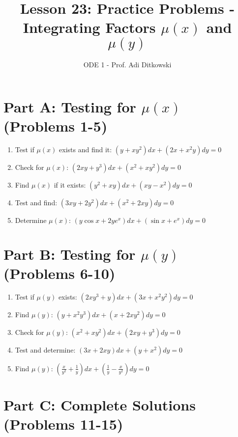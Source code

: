 \documentclass[12pt]{article}
\title{Lesson 23: Practice Problems - Integrating Factors $\mu(x)$ and $\mu(y)$}
\author{ODE 1 - Prof. Adi Ditkowski}
\date{}
\begin{document}
\maketitle

\section*{Part A: Testing for $\mu(x)$ (Problems 1-5)}

\begin{enumerate}
\item Test if $\mu(x)$ exists and find it: $(y + xy^2)dx + (2x + x^2y)dy = 0$

\item Check for $\mu(x)$: $(2xy + y^3)dx + (x^2 + xy^2)dy = 0$

\item Find $\mu(x)$ if it exists: $(y^2 + xy)dx + (xy - x^2)dy = 0$

\item Test and find: $(3xy + 2y^2)dx + (x^2 + 2xy)dy = 0$

\item Determine $\mu(x)$: $(y\cos x + 2ye^x)dx + (\sin x + e^x)dy = 0$
\end{enumerate}

\section*{Part B: Testing for $\mu(y)$ (Problems 6-10)}

\begin{enumerate}[start=6]
\item Test if $\mu(y)$ exists: $(2xy^3 + y)dx + (3x + x^2y^2)dy = 0$

\item Find $\mu(y)$: $(y + x^2y^3)dx + (x + 2xy^2)dy = 0$

\item Check for $\mu(y)$: $(x^2 + xy^2)dx + (2xy + y^3)dy = 0$

\item Test and determine: $(3x + 2xy)dx + (y + x^2)dy = 0$

\item Find $\mu(y)$: $(\frac{x}{y^2} + \frac{1}{y})dx + (\frac{1}{y} - \frac{x}{y^2})dy = 0$
\end{enumerate}

\section*{Part C: Complete Solutions (Problems 11-15)}
\end{document}
